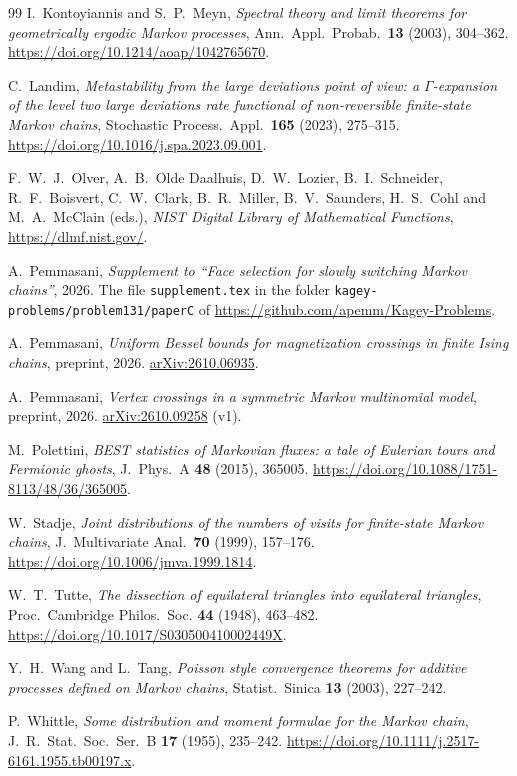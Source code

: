 \documentclass[EJP,preprint]{ejpecp}
\theoremstyle{ejpecpbodyit}
\begin{document}
\begin{thebibliography}{99}
I.~Kontoyiannis and S.~P.~Meyn, \emph{Spectral theory and limit theorems for
geometrically ergodic Markov processes}, Ann.~Appl.~Probab.~\textbf{13} (2003),
304--362. \url{https://doi.org/10.1214/aoap/1042765670}.

C.~Landim, \emph{Metastability from the large deviations point of view: a
$\Gamma$-expansion of the level two large deviations rate functional of
non-reversible finite-state Markov chains}, Stochastic Process.~Appl.~\textbf{165}
(2023), 275--315. \url{https://doi.org/10.1016/j.spa.2023.09.001}.

F.~W.~J.~Olver, A.~B.~Olde Daalhuis, D.~W.~Lozier, B.~I.~Schneider,
R.~F.~Boisvert, C.~W.~Clark, B.~R.~Miller, B.~V.~Saunders, H.~S.~Cohl and
M.~A.~McClain (eds.), \emph{NIST Digital Library of Mathematical Functions},
\url{https://dlmf.nist.gov/}.

A.~Pemmasani, \emph{Supplement to ``Face selection for slowly switching Markov chains''},
2026. The file \nolinkurl{supplement.tex} in the folder
\nolinkurl{kagey-problems/problem131/paperC} of \url{https://github.com/apemm/Kagey-Problems}.

A.~Pemmasani, \emph{Uniform Bessel bounds for magnetization crossings in finite
Ising chains}, preprint, 2026.
\href{https://arxiv.org/abs/2610.06935}{arXiv:2610.06935}.

A.~Pemmasani, \emph{Vertex crossings in a symmetric Markov multinomial
model}, preprint, 2026. \href{https://arxiv.org/abs/2610.09258v1}{arXiv:2610.09258} (v1).

M.~Polettini, \emph{BEST statistics of Markovian fluxes: a tale of Eulerian
tours and Fermionic ghosts}, J.~Phys.~A \textbf{48} (2015), 365005.
\url{https://doi.org/10.1088/1751-8113/48/36/365005}.

W.~Stadje, \emph{Joint distributions of the numbers of visits for finite-state
Markov chains}, J.~Multivariate Anal.~\textbf{70} (1999), 157--176.
\url{https://doi.org/10.1006/jmva.1999.1814}.

W.~T.~Tutte, \emph{The dissection of equilateral triangles into equilateral
triangles}, Proc.~Cambridge Philos.~Soc. \textbf{44} (1948), 463--482.
\url{https://doi.org/10.1017/S030500410002449X}.

Y.~H.~Wang and L.~Tang, \emph{Poisson style convergence theorems for
additive processes defined on Markov chains},
Statist.~Sinica \textbf{13} (2003), 227--242.

P.~Whittle, \emph{Some distribution and moment formulae for the Markov
chain}, J.~R.~Stat.~Soc.~Ser.~B \textbf{17} (1955), 235--242.
\url{https://doi.org/10.1111/j.2517-6161.1955.tb00197.x}.

\end{thebibliography}
\end{document}
